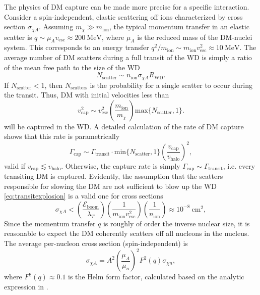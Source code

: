 \documentclass[preprintnumbers,amsmath,amssymb,prd,superscriptaddress]{revtex4}
\newcommand{\Eboom}{\mathcal{E}_\text{boom}}
\newcommand{\MeV}{\text{MeV}}
\newcommand{\cm}{\text{cm}}
\def\r{\right)}
\def\l{\left(}
\begin{document}
The physics of DM capture can be made more precise for a specific interaction.
Consider a spin-independent, elastic scattering off ions characterized by cross section $\sigma_{\chi A}$. 
Assuming $m_\chi \gg m_\text{ion}$, the typical momentum transfer in an elastic scatter is $q \sim \mu_{A} v_\text{esc} \approx 200 ~\MeV$, where $\mu_{A}$ is the reduced mass of the DM-nuclei system. 
This corresponds to an energy transfer $q^2/m_\text{ion} \sim m_\text{ion} v_\text{esc}^2 \approx 10 ~\MeV$. 
The average number of DM scatters during a full transit of the WD is simply a ratio of the mean free path to the size of the WD
\begin{equation}
N_\text{scatter} \sim n_\text{ion} \sigma_{\chi A} R_\text{WD}.
\end{equation}
If $N_\text{scatter} < 1$, then $N_\text{scatters}$ is the probability for a single scatter to occur during the transit. 
Thus, DM with initial velocities less than
\begin{equation}
\label{eq:capture}
v_\text{cap}^2 \sim v_\text{esc}^2 \l \frac{m_\text{ion}}{m_\chi} \r \text{max}\{N_\text{scatter} ,1\}.
\end{equation}
will be captured in the WD. 
A detailed calculation of the rate of DM capture \cite{Gould} shows that this rate is parametrically
\begin{equation}
\Gamma_\text{cap} \sim \Gamma_\text{transit} \cdot \text{min}\{N_\text{scatter}, 1\} \l \frac{v_\text{cap}}{v_\text{halo}} \r^2,
\end{equation}
valid if $v_\text{cap} \lesssim v_\text{halo}$. 
Otherwise, the capture rate is simply $\Gamma_\text{cap} \sim \Gamma_\text{transit}$, i.e. every transiting DM is captured. 
Evidently, the assumption that the scatters responsible for slowing the DM are not sufficient to blow up the WD \eqref{eq:transitexplosion} is a valid one for cross sections
\begin{equation}
\sigma_{\chi A} < \l \frac{\Eboom}{\lambda_T} \r \l \frac{1}{m_\text{ion} v_\text{esc}^2} \r \l \frac{1}{n_\text{ion}} \r \approx 10^{-8} ~\cm^2,
\end{equation}
Since the momentum transfer $q$ is roughly of order the inverse nuclear size, it is reasonable to expect the DM coherently scatters off all nucleons in the nucleus. 
The average per-nucleon cross section (spin-independent) is
\begin{equation}
\sigma_{\chi A} = A^2 \l \frac{\mu_{A}}{\mu_{n}}\r^2 F^2(q) \sigma_{\chi n},
\end{equation}
where $F^2(q) \approx 0.1$ is the Helm form factor, calculated based on the analytic expression in \cite{LUX thesis}. 
\end{document}
